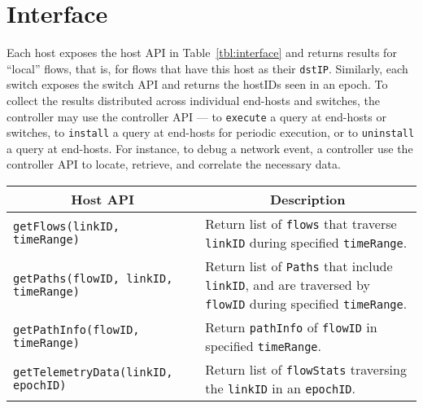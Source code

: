 \section{Interface}
Each host exposes the host API in Table~\ref{tbl:interface} and returns results for ``local'' flows, that is, for flows that have this host as their {\tt dstIP}. Similarly, each switch exposes the switch API and returns the hostIDs seen in an epoch. To collect the results distributed across individual end-hosts and switches, the controller may use the controller API --- to {\tt execute} a query at end-hosts or switches, to {\tt install} a query at end-hosts for periodic execution, or to {\tt uninstall} a query at end-hosts. For instance, to debug a network event, a controller use the controller API to locate, retrieve, and correlate the necessary data.
\begin{table}
\centering
{\small
{}
\begin{tabular}{@{}l@{}p{3.85in}@{}}
  \toprule
  \multicolumn{1}{c}{\textbf{Host API}} & \multicolumn{1}{c}{\textbf{Description}} \\
  \midrule
  \texttt{getFlows(linkID, timeRange)} & Return list of {\tt flows} that traverse {\tt linkID} during specified {\tt timeRange}. \\
  \texttt{getPaths(flowID, linkID, timeRange)} & Return list of {\tt Paths} that include {\tt linkID}, and are traversed by {\tt flowID} during specified {\tt timeRange}.\\

  \texttt{getPathInfo(flowID, timeRange)} & Return {\tt pathInfo} of {\tt flowID} in specified {\tt timeRange}. \\
  \texttt{getTelemetryData(linkID, epochID)} & Return list of {\tt flowStats} traversing the {\tt linkID} in an {\tt epochID}. \\


\end{tabular}}
\end{table}
